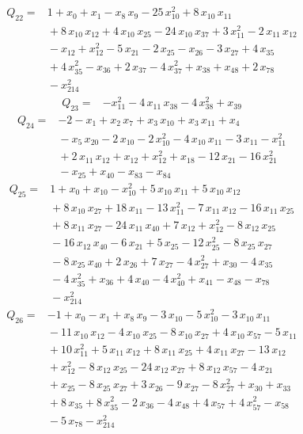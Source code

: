 \documentclass[11pt]{article}
\theoremstyle{definition}\newtheorem{definition}[theorem]{Definition}
\begin{document}
\begin{align*}
Q_{22}={}&1+x_{0}+x_{1}-x_{8}\,x_{9}-25\,x_{10}^{2}+8\,x_{10}\,x_{11}
\\ &{}+8\,x_{10}\,x_{12}+4\,x_{10}\,x_{25}-24\,x_{10}\,x_{37}+3\,x_{11}^{2}-2\,x_{11}\,x_{12}
\\ &{}-x_{12}+x_{12}^{2}-5\,x_{21}-2\,x_{25}-x_{26}-3\,x_{27}+4\,x_{35}
\\ &{}+4\,x_{35}^{2}-x_{36}+2\,x_{37}-4\,x_{37}^{2}+x_{38}+x_{48}+2\,x_{78}
\\ &{}-x_{214}^{2}
\end{align*}
\begin{align*}
Q_{23}={}&-x_{11}^{2}-4\,x_{11}\,x_{38}-4\,x_{38}^{2}+x_{39}
\end{align*}
\begin{align*}
Q_{24}={}&-2-x_{1}+x_{2}\,x_{7}+x_{3}\,x_{10}+x_{3}\,x_{11}+x_{4}
\\ &{}-x_{5}\,x_{20}-2\,x_{10}-2\,x_{10}^{2}-4\,x_{10}\,x_{11}-3\,x_{11}-x_{11}^{2}
\\ &{}+2\,x_{11}\,x_{12}+x_{12}+x_{12}^{2}+x_{18}-12\,x_{21}-16\,x_{21}^{2}
\\ &{}-x_{25}+x_{40}-x_{83}-x_{84}
\end{align*}
\begin{align*}
Q_{25}={}&1+x_{0}+x_{10}-x_{10}^{2}+5\,x_{10}\,x_{11}+5\,x_{10}\,x_{12}
\\ &{}+8\,x_{10}\,x_{27}+18\,x_{11}-13\,x_{11}^{2}-7\,x_{11}\,x_{12}-16\,x_{11}\,x_{25}
\\ &{}+8\,x_{11}\,x_{27}-24\,x_{11}\,x_{40}+7\,x_{12}+x_{12}^{2}-8\,x_{12}\,x_{25}
\\ &{}-16\,x_{12}\,x_{40}-6\,x_{21}+5\,x_{25}-12\,x_{25}^{2}-8\,x_{25}\,x_{27}
\\ &{}-8\,x_{25}\,x_{40}+2\,x_{26}+7\,x_{27}-4\,x_{27}^{2}+x_{30}-4\,x_{35}
\\ &{}-4\,x_{35}^{2}+x_{36}+4\,x_{40}-4\,x_{40}^{2}+x_{41}-x_{48}-x_{78}
\\ &{}-x_{214}^{2}
\end{align*}
\begin{align*}
Q_{26}={}&-1+x_{0}-x_{1}+x_{8}\,x_{9}-3\,x_{10}-5\,x_{10}^{2}-3\,x_{10}\,x_{11}
\\ &{}-11\,x_{10}\,x_{12}-4\,x_{10}\,x_{25}-8\,x_{10}\,x_{27}+4\,x_{10}\,x_{57}-5\,x_{11}
\\ &{}+10\,x_{11}^{2}+5\,x_{11}\,x_{12}+8\,x_{11}\,x_{25}+4\,x_{11}\,x_{27}-13\,x_{12}
\\ &{}+x_{12}^{2}-8\,x_{12}\,x_{25}-24\,x_{12}\,x_{27}+8\,x_{12}\,x_{57}-4\,x_{21}
\\ &{}+x_{25}-8\,x_{25}\,x_{27}+3\,x_{26}-9\,x_{27}-8\,x_{27}^{2}+x_{30}+x_{33}
\\ &{}+8\,x_{35}+8\,x_{35}^{2}-2\,x_{36}-4\,x_{48}+4\,x_{57}+4\,x_{57}^{2}-x_{58}
\\ &{}-5\,x_{78}-x_{214}^{2}
\end{align*}
\end{document}
